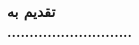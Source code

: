 
\clearpage
\thispagestyle{empty}

{\BNazaninScaleOne
{\fontsize{20pt}{0}\selectfont \bfseries
\noindent
تقدیم به
\\[1cm]
\hspace*{1cm}
............................
}}
		
\restoregeometry